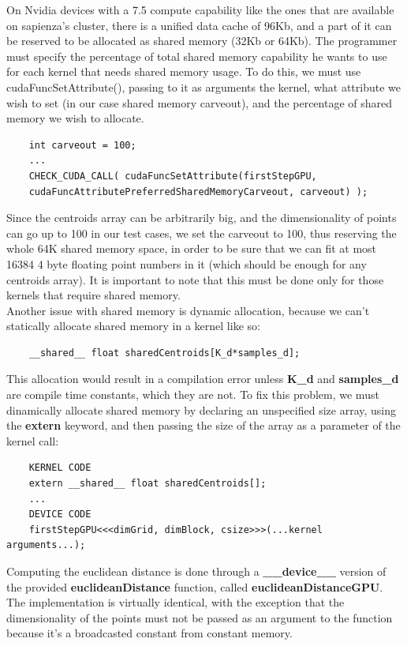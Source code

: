 \documentclass{article}
\begin{document}
On Nvidia devices with a 7.5 compute capability like the ones that are available on sapienza's cluster, there is a unified data cache of 96Kb, and a part of it can be reserved to be allocated as shared memory (32Kb or 64Kb). The programmer must specify the percentage of total shared memory capability he wants to use for each kernel that needs shared memory usage. To do this, we must use cudaFuncSetAttribute(), passing to it as arguments the kernel, what attribute we wish to set (in our case shared memory carveout), and the percentage of shared memory we wish to allocate.
\begin{lstlisting}
    int carveout = 100;
    ...
    CHECK_CUDA_CALL( cudaFuncSetAttribute(firstStepGPU,
    cudaFuncAttributePreferredSharedMemoryCarveout, carveout) );
\end{lstlisting}
Since the centroids array can be arbitrarily big, and the dimensionality of points can go up to 100 in our test cases, we set the carveout to 100, thus reserving the whole 64K shared memory space, in order to be sure that we can fit at most 16384 4 byte floating point numbers in it (which should be enough for any centroids array). It is important to note that this must be done only for those kernels that require shared memory. \\ 
Another issue with shared memory is dynamic allocation, because we can't statically allocate shared memory in a kernel like so:
\begin{lstlisting}
    __shared__ float sharedCentroids[K_d*samples_d];
\end{lstlisting}
This allocation would result in a compilation error unless \textbf{K\_d} and \textbf{samples\_d} are compile time constants, which they are not. To fix this problem, we must dinamically allocate shared memory by declaring an unspecified size array, using the \textbf{extern} keyword, and then passing the size of the array as a parameter of the kernel call:
\begin{lstlisting}
    KERNEL CODE
    extern __shared__ float sharedCentroids[];
    ...
    DEVICE CODE
    firstStepGPU<<<dimGrid, dimBlock, csize>>>(...kernel arguments...);
\end{lstlisting}
Computing the euclidean distance is done through a \textbf{\_\_device\_\_} version of the provided \textbf{euclideanDistance} function, called \textbf{euclideanDistanceGPU}. The implementation is virtually identical, with the exception that the dimensionality of the points must not be passed as an argument to the function because it's a broadcasted constant from constant memory.
\end{document}
